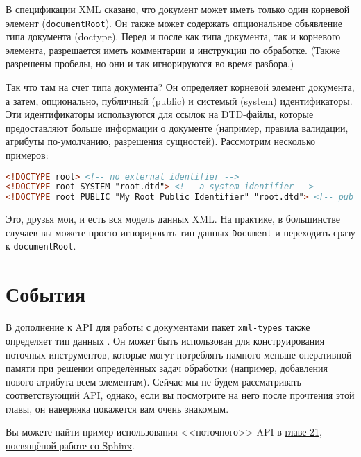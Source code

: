 В спецификации XML сказано, что документ может иметь только один корневой элемент (\lstinline!documentRoot!). Он также может содержать опциональное объявление типа документа (doctype). Перед и после как типа документа, так и корневого элемента, разрешается иметь комментарии и инструкции по обработке. (Также разрешены пробелы, но они и так игнорируются во время разбора.)

Так что там на счет типа документа? Он определяет корневой элемент документа, а затем, опционально, публичный (public) и системый (system) идентификаторы. Эти идентификаторы используются для ссылок на DTD-файлы, которые предоставляют больше информации о документе (например, правила валидации, атрибуты по-умолчанию, разрешения сущностей). Рассмотрим несколько примеров:

\begin{lstlisting}[language=HTML]
<!DOCTYPE root> <!-- no external identifier -->
<!DOCTYPE root SYSTEM "root.dtd"> <!-- a system identifier -->
<!DOCTYPE root PUBLIC "My Root Public Identifier" "root.dtd"> <!-- public identifiers have a system ID as well -->
\end{lstlisting}

Это, друзья мои, и есть вся модель данных XML. На практике, в большинстве случаев вы можете просто игнорировать тип данных \lstinline!Document! и переходить сразу к \lstinline!documentRoot!.

\section{События} %

В дополнение к API для работы с документами пакет \lstinline!xml-types! также определяет тип данных . Он может быть использован для конструирования поточных инструментов, которые могут потреблять намного меньше оперативной памяти при решении определённых задач обработки (например, добавления нового атрибута всем элементам). Сейчас мы не будем рассматривать соответствующий API, однако, если вы посмотрите на него после прочтения этой главы, он наверняка покажется вам очень знакомым.

\begin{remark}
Вы можете найти пример использования <<поточного>> API в \hyperref[chap:sphinx]{главе 21, посвящёной работе со Sphinx}.
\end{remark}

